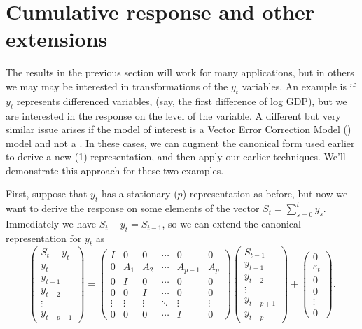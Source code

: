 \documentclass[12pt,fleqn]{article}
\newcommand{\vep}{\varepsilon}
\newcommand{\VECM}{\allcaps{VECM}}
\begin{document}
\section{Cumulative response and other extensions}\label{extensions}

The results in the previous section will work for many applications,
but in others we may may be interested in transformations of the $y_t$
variables. An example is if $y_t$ represents differenced variables,
(say, the first difference of log GDP), but we are interested in the
response on the level of the variable. A different but very similar
issue arises if the model of interest is a Vector Error Correction
Model (\VECM) model and not a \VAR. In these cases, we can augment the
canonical form used earlier to derive a new \VAR(1) representation,
and then apply our earlier techniques. We'll demonstrate this approach
for these two examples.

First, suppose that $y_t$ has a stationary \VAR($p$) representation as
before, but now we want to derive the response on some elements of the
vector $S_t = \sum_{s=0}^t y_s$. Immediately we have $S_t - y_t =
S_{t-1}$, so we can extend the canonical representation for $y_t$ as
\begin{equation*}
  \begin{pmatrix}
    S_t - y_t \\ y_t \\ y_{t-1} \\ y_{t-2} \\ \vdots \\ y_{t-p+1}
  \end{pmatrix}
  =
  \begin{pmatrix}
    I & 0 & 0 & \cdots & 0 & 0 \\
    0 & A_1 & A_2 & \cdots & A_{p-1} & A_p \\
    0 & I   & 0 & \cdots & 0 & 0 \\
    0 & 0   & I & \cdots & 0 & 0 \\
    \vdots & \vdots & \vdots & \ddots & \vdots & \vdots \\
    0 & 0 & 0 & \cdots & I & 0
  \end{pmatrix}
  \begin{pmatrix}
    S_{t-1}  \\ y_{t-1} \\ y_{t-2} \\ \vdots \\ y_{t-p+1} \\ y_{t-p}
  \end{pmatrix}
  +
  \begin{pmatrix}
    0 \\ \vep_t \\ 0 \\ 0 \\ \vdots \\ 0
  \end{pmatrix}.
\end{equation*}
\end{document}
